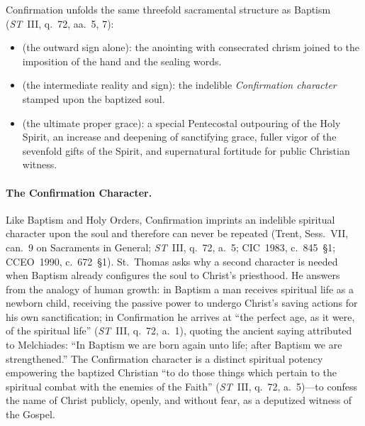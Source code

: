 Confirmation unfolds the same threefold sacramental structure as Baptism (\emph{ST}~III, q.~72, aa.~5, 7):
\begin{itemize}
  \item \textbf{} (the outward sign alone): the anointing with consecrated chrism joined to the imposition of the hand and the sealing words.
  \item \textbf{} (the intermediate reality and sign): the indelible \emph{Confirmation character} stamped upon the baptized soul.
  \item \textbf{} (the ultimate proper grace): a special Pentecostal outpouring of the Holy Spirit, an increase and deepening of sanctifying grace, fuller vigor of the sevenfold gifts of the Spirit, and supernatural fortitude for public Christian witness.
\end{itemize}

\paragraph{The Confirmation Character.}
Like Baptism and Holy Orders, Confirmation imprints an indelible spiritual character upon the soul and therefore can never be repeated (Trent, Sess.~VII, can.~9 on Sacraments in General; \emph{ST}~III, q.~72, a.~5; CIC~1983, c.~845~\S1; CCEO~1990, c.~672~\S1). St.~Thomas asks why a second character is needed when Baptism already configures the soul to Christ's priesthood. He answers from the analogy of human growth: in Baptism a man receives spiritual life as a newborn child, receiving the passive power to undergo Christ's saving actions for his own sanctification; in Confirmation he arrives at ``the perfect age, as it were, of the spiritual life'' (\emph{ST}~III, q.~72, a.~1), quoting the ancient saying attributed to Melchiades: ``In Baptism we are born again unto life; after Baptism we are strengthened.'' The Confirmation character is a distinct spiritual potency empowering the baptized Christian ``to do those things which pertain to the spiritual combat with the enemies of the Faith'' (\emph{ST}~III, q.~72, a.~5)---to confess the name of Christ publicly, openly, and without fear, as a deputized witness of the Gospel.

